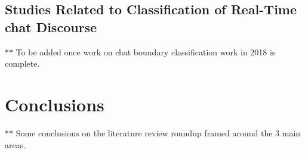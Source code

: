 \subsection{Studies Related to Classification of Real-Time chat Discourse}

** To be added once work on chat boundary classification work in 2018 is complete.

\section{Conclusions}

** Some conclusions on the literature review roundup framed around the 3 main areas.







